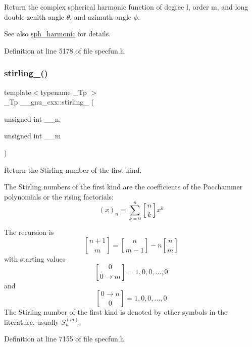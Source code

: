 Return the complex spherical harmonic function of degree {\ttfamily l}, order {\ttfamily m}, and {\ttfamily long double} zenith angle $ \theta $, and azimuth angle $ \phi $.

\begin{DoxySeeAlso}{See also}
\hyperlink{group__mathsf__gnu_gacbff28988d5d36f0c3b3fe03d4f57896}{sph\+\_\+harmonic} for details. 
\end{DoxySeeAlso}


Definition at line 5178 of file specfun.\+h.

\mbox{\label{group__mathsf__gnu_ga2b955dac7d2c5125f2091eaeb25c8ad2}} 
\subsubsection{\texorpdfstring{stirling\+\_()}{stirling\_1()}\hspace{0.1cm}{\footnotesize\ttfamily [1/2]}}
{\footnotesize\ttfamily template$<$typename \+\_\+\+Tp $>$ \\
\+\_\+\+Tp \+\_\+\+\_\+gnu\+\_\+cxx\+::stirling\+\_ (\begin{DoxyParamCaption}\item[{unsigned int}]{\+\_\+\+\_\+n,  }\item[{unsigned int}]{\+\_\+\+\_\+m }\end{DoxyParamCaption})\hspace{0.3cm}{\ttfamily [inline]}}

Return the Stirling number of the first kind.

The Stirling numbers of the first kind are the coefficients of the Pocchammer polynomials or the rising factorials\+: \[ (x)_n = \sum_{k=0}^{n} \genfrac{[}{]}{0pt}{0}{n}{k} x^k \]

The recursion is \[ \genfrac{[}{]}{0pt}{0}{n+1}{m} = \genfrac{[}{]}{0pt}{0}{n}{m-1} - n \genfrac{[}{]}{0pt}{0}{n}{m} \] with starting values \[ \genfrac{[}{]}{0pt}{0}{0}{0\rightarrow m} = {1, 0, 0, ..., 0} \] and \[ \genfrac{[}{]}{0pt}{0}{0\rightarrow n}{0} = {1, 0, 0, ..., 0} \] The Stirling number of the first kind is denoted by other symbols in the literature, usually $ S_n^{(m)} $. 

Definition at line 7155 of file specfun.\+h.


